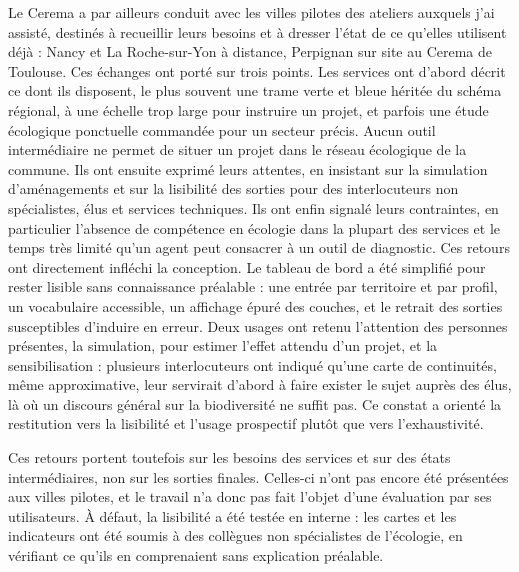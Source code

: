 \documentclass[a4paper,12pt]{report}
\begin{document}
Le Cerema a par ailleurs conduit avec les villes pilotes des ateliers auxquels j'ai assisté, destinés à recueillir leurs besoins et à dresser l'état de ce qu'elles utilisent déjà : Nancy et La Roche-sur-Yon à distance, Perpignan sur site au Cerema de Toulouse. Ces échanges ont porté sur trois points. Les services ont d'abord décrit ce dont ils disposent, le plus souvent une trame verte et bleue héritée du schéma régional, à une échelle trop large pour instruire un projet, et parfois une étude écologique ponctuelle commandée pour un secteur précis. Aucun outil intermédiaire ne permet de situer un projet dans le réseau écologique de la commune. Ils ont ensuite exprimé leurs attentes, en insistant sur la simulation d'aménagements et sur la lisibilité des sorties pour des interlocuteurs non spécialistes, élus et services techniques. Ils ont enfin signalé leurs contraintes, en particulier l'absence de compétence en écologie dans la plupart des services et le temps très limité qu'un agent peut consacrer à un outil de diagnostic. Ces retours ont directement infléchi la conception. Le tableau de bord a été simplifié pour rester lisible sans connaissance préalable : une entrée par territoire et par profil, un vocabulaire accessible, un affichage épuré des couches, et le retrait des sorties susceptibles d'induire en erreur. Deux usages ont retenu l'attention des personnes présentes, la simulation, pour estimer l'effet attendu d'un projet, et la sensibilisation : plusieurs interlocuteurs ont indiqué qu'une carte de continuités, même approximative, leur servirait d'abord à faire exister le sujet auprès des élus, là où un discours général sur la biodiversité ne suffit pas. Ce constat a orienté la restitution vers la lisibilité et l'usage prospectif plutôt que vers l'exhaustivité.
 
Ces retours portent toutefois sur les besoins des services et sur des états intermédiaires, non sur les sorties finales. Celles-ci n'ont pas encore été présentées aux villes pilotes, et le travail n'a donc pas fait l'objet d'une évaluation par ses utilisateurs. À défaut, la lisibilité a été testée en interne : les cartes et les indicateurs ont été soumis à des collègues non spécialistes de l'écologie, en vérifiant ce qu'ils en comprenaient sans explication préalable.
\end{document}
